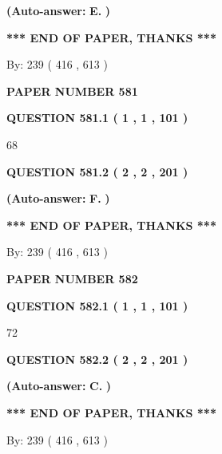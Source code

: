 \documentclass[12pt]{article}
\begin{document}
 
{\textbf{(Auto-answer:}}
{\textbf{\large{
E.}}}
{\textbf{)}}
 
 
   
   
   
   
\vspace{1.0in} 
{\textbf{\large{ *** END OF PAPER, THANKS *** }}} 
   
   
\hspace{1.0in} By: 
 239 ( 416 ,  613 )
   
   
   
   
\newpage 
\setcounter{page}{ 
   581001 } 
   
   
 {\textbf{ \Large{ PAPER NUMBER  581  }}}
   
   
   
   
  
  
{\textbf{\large{QUESTION
581.1 
 ( 1 , 1 , 101 )
}}}

68
  
  
{\textbf{\large{QUESTION
581.2 
 ( 2 , 2 , 201 )
}}}
 
 
{\textbf{(Auto-answer:}}
{\textbf{\large{
F.}}}
{\textbf{)}}
 
 
   
   
   
   
\vspace{1.0in} 
{\textbf{\large{ *** END OF PAPER, THANKS *** }}} 
   
   
\hspace{1.0in} By: 
 239 ( 416 ,  613 )
   
   
   
   
\newpage 
\setcounter{page}{ 
   582001 } 
   
   
 {\textbf{ \Large{ PAPER NUMBER  582  }}}
   
   
   
   
  
  
{\textbf{\large{QUESTION
582.1 
 ( 1 , 1 , 101 )
}}}

72
  
  
{\textbf{\large{QUESTION
582.2 
 ( 2 , 2 , 201 )
}}}
 
 
{\textbf{(Auto-answer:}}
{\textbf{\large{
C.}}}
{\textbf{)}}
 
 
   
   
   
   
\vspace{1.0in} 
{\textbf{\large{ *** END OF PAPER, THANKS *** }}} 
   
   
\hspace{1.0in} By: 
 239 ( 416 ,  613 )
   
   
   
\end{document}
